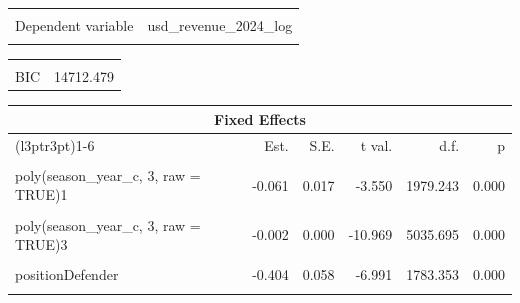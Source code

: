 \documentclass[
  12pt]{article}
\begin{document}
\begin{table}[!h]
\centering
\begin{tabular}{lr}
\toprule
\cellcolor{gray!10}{Observations} & \cellcolor{gray!10}{7023}\\
Dependent variable & usd\_revenue\_2024\_log\\
\cellcolor{gray!10}{Type} & \cellcolor{gray!10}{Mixed effects linear regression}\\
\bottomrule
\end{tabular}
\end{table} \begin{table}[!h]
\centering
\begin{tabular}{lr}
\toprule
\cellcolor{gray!10}{AIC} & \cellcolor{gray!10}{14520.484}\\
BIC & 14712.479\\
\bottomrule
\end{tabular}
\end{table} \begin{table}[!h]
\centering
\begin{threeparttable}
\begin{tabular}{lrrrrr}
\toprule
\multicolumn{6}{c}{Fixed Effects} \\
\cmidrule(l{3pt}r{3pt}){1-6}
  & Est. & S.E. & t val. & d.f. & p\\
\midrule
\cellcolor{gray!10}{(Intercept)} & \cellcolor{gray!10}{16.857} & \cellcolor{gray!10}{0.079} & \cellcolor{gray!10}{212.455} & \cellcolor{gray!10}{77.432} & \cellcolor{gray!10}{0.000}\\
poly(season\_year\_c, 3, raw = TRUE)1 & -0.061 & 0.017 & -3.550 & 1979.243 & 0.000\\
\cellcolor{gray!10}{poly(season\_year\_c, 3, raw = TRUE)2} & \cellcolor{gray!10}{0.028} & \cellcolor{gray!10}{0.003} & \cellcolor{gray!10}{8.097} & \cellcolor{gray!10}{5037.191} & \cellcolor{gray!10}{0.000}\\
poly(season\_year\_c, 3, raw = TRUE)3 & -0.002 & 0.000 & -10.969 & 5035.695 & 0.000\\
\cellcolor{gray!10}{height\_c} & \cellcolor{gray!10}{0.010} & \cellcolor{gray!10}{0.004} & \cellcolor{gray!10}{2.704} & \cellcolor{gray!10}{1797.210} & \cellcolor{gray!10}{0.007}\\
\addlinespace
positionDefender & -0.404 & 0.058 & -6.991 & 1783.353 & 0.000\\
\cellcolor{gray!10}{positionGoalkeeper} & \cellcolor{gray!10}{-1.057} & \cellcolor{gray!10}{0.095} & \cellcolor{gray!10}{-11.166} & \cellcolor{gray!10}{1795.098} & \cellcolor{gray!10}{0.000}\\

\end{tabular}
\end{threeparttable}
\end{table}
\end{document}
